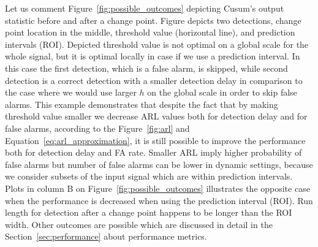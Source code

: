 Let us comment Figure~\ref{fig:possible_outcomes} depicting Cusum's output statistic before and after a change point.
Figure depicts two detections, change point location in the middle, threshold value (horizontal line), and prediction intervals (ROI).
Depicted threshold value is not optimal on a global scale for the whole signal, but it is optimal locally in case if we use a prediction interval.
In this case the first detection, which is a false alarm, is skipped, while second detection is a correct detection with a smaller detection delay in comparison to the case where we would use larger $h$ on the global scale in order to skip false alarms.
This example demonstrates that despite the fact that by making threshold value smaller we decrease ARL values both for detection delay and for false alarms, according to the Figure~\ref{fig:arl} and Equation~\ref{eq:arl_approximation}, it is still possible to improve the performance both for detection delay and FA rate.
Smaller ARL imply higher probability of false alarms but number of false alarms can be lower in dynamic settings, because we consider subsets of the input signal which are within prediction intervals.
Plots in column B on Figure~\ref{fig:possible_outcomes} illustrates the opposite case when the performance is decreased when using the prediction interval (ROI).
Run length for detection after a change point happens to be longer than the ROI width. Other outcomes are possible which are discussed in detail in the Section~\ref{sec:performance} about performance metrics.

